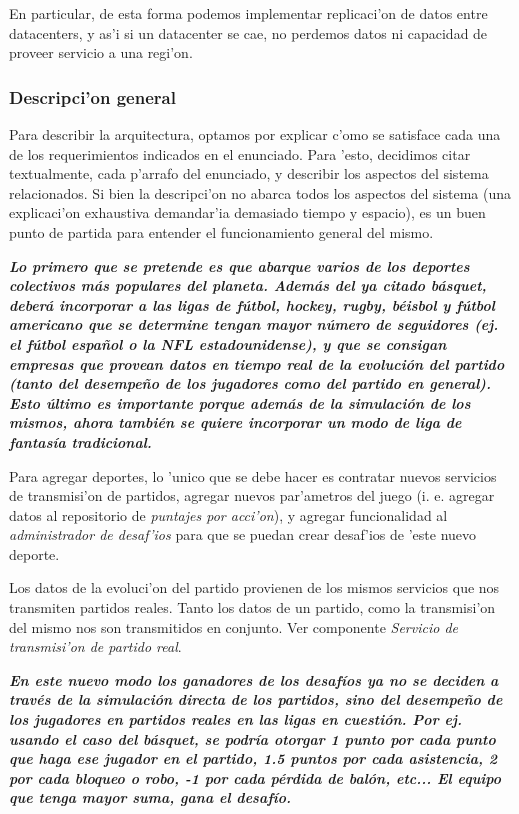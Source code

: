 \noindent
En particular, de esta forma podemos implementar replicaci'on de datos entre datacenters, y as'i si un datacenter se cae, no perdemos datos ni capacidad de proveer servicio a una regi'on.

\subsubsection{Descripci'on general}

Para describir la arquitectura, optamos por explicar c'omo se satisface cada una de los requerimientos indicados en el enunciado. Para 'esto, decidimos citar textualmente, cada p'arrafo del enunciado, y describir los aspectos del sistema relacionados. Si bien la descripci'on no abarca todos los aspectos del sistema (una explicaci'on exhaustiva demandar'ia demasiado tiempo y espacio), es un buen punto de partida para entender el funcionamiento general del mismo.

\textbf{\textit{Lo primero que se pretende es que abarque varios de los deportes colectivos más populares del planeta. Además del ya citado básquet, deberá incorporar a las ligas de fútbol, hockey, rugby, béisbol y fútbol americano que se determine tengan mayor número de seguidores (ej. el fútbol español o la NFL estadounidense), y que se consigan empresas que provean datos en tiempo real de la evolución del partido (tanto del desempeño de los jugadores como del partido en general). Esto último es importante porque además de la simulación de los mismos, ahora también se quiere incorporar un modo de liga de fantasía tradicional.}}

Para agregar deportes, lo 'unico que se debe hacer es contratar nuevos servicios de transmisi'on de partidos, agregar nuevos par'ametros del juego (i. e. agregar datos al repositorio de \textit{puntajes por acci'on}), y agregar funcionalidad al \textit{administrador de desaf'ios} para que se puedan crear desaf'ios de 'este nuevo deporte.

Los datos de la evoluci'on del partido provienen de los mismos servicios que nos transmiten partidos reales. Tanto los datos de un partido, como la transmisi'on del mismo nos son transmitidos en conjunto. Ver componente \textit{Servicio de transmisi'on de partido real}.

\textbf{\textit{En este nuevo modo los ganadores de los desafíos ya no se deciden a través de la simulación directa de los partidos, sino del desempeño de los jugadores en partidos reales en las ligas en cuestión. Por ej. usando el caso del básquet, se podría otorgar 1 punto por cada punto que haga ese jugador en el partido, 1.5 puntos por cada asistencia, 2 por cada bloqueo o robo, -1 por cada pérdida de balón, etc... El equipo que tenga mayor suma, gana el desafío.}}


